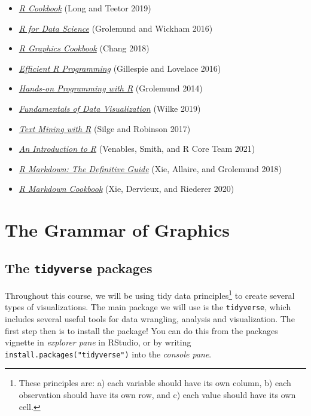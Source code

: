 \documentclass[
  letterpaper,
  DIV=11,
  numbers=noendperiod]{scrreprt}
\providecommand{\tightlist}{%
  \setlength{\itemsep}{0pt}\setlength{\parskip}{0pt}}\usepackage{longtable,booktabs,array}
\begin{document}
\begin{itemize}
\tightlist
\item
  \href{https://rc2e.com/}{\emph{R Cookbook}} (Long and Teetor 2019)
\item
  \href{https://r4ds.had.co.nz/}{\emph{R for Data Science}} (Grolemund
  and Wickham 2016)
\item
  \href{https://r-graphics.org/}{\emph{R Graphics Cookbook}} (Chang
  2018)
\item
  \href{https://csgillespie.github.io/efficientR/}{\emph{Efficient R
  Programming}} (Gillespie and Lovelace 2016)
\item
  \href{https://rstudio-education.github.io/hopr/}{\emph{Hands-on
  Programming with R}} (Grolemund 2014)
\item
  \href{https://clauswilke.com/dataviz/}{\emph{Fundamentals of Data
  Visualization}} (Wilke 2019)
\item
  \href{https://www.tidytextmining.com/}{\emph{Text Mining with R}}
  (Silge and Robinson 2017)
\item
  \href{https://cran.r-project.org/doc/manuals/R-intro.pdf}{\emph{An
  Introduction to R}} (Venables, Smith, and R Core Team 2021)
\item
  \href{https://bookdown.org/yihui/rmarkdown/}{\emph{R Markdown: The
  Definitive Guide}} (Xie, Allaire, and Grolemund 2018)
\item
  \href{https://bookdown.org/yihui/rmarkdown-cookbook/}{\emph{R Markdown
  Cookbook}} (Xie, Dervieux, and Riederer 2020)
\end{itemize}


\chapter{The Grammar of Graphics}\label{ggbasics}

\section{\texorpdfstring{The \texttt{tidyverse}
packages}{The tidyverse packages}}\label{the-tidyverse-packages}

Throughout this course, we will be using tidy data principles\footnote{These
  principles are: a) each variable should have its own column, b) each
  observation should have its own row, and c) each value should have its
  own cell.} to create several types of visualizations. The main package
we will use is the \texttt{tidyverse}, which includes several useful
tools for data wrangling, analysis and visualization. The first step
then is to install the package! You can do this from the packages
vignette in \emph{explorer pane} in RStudio, or by writing
\texttt{install.packages("tidyverse")} into the \emph{console pane}.
\end{document}

